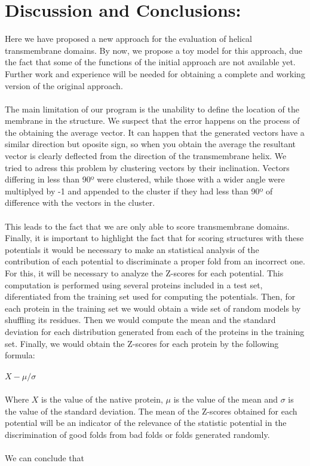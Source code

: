 \documentclass[12pt,titlepage]{article}
\theoremstyle{supercalifragilisticexpialidocious}
\begin{document}
\section{Discussion and Conclusions: }

Here we have proposed a new approach for the evaluation of helical transmembrane domains. By now, we propose a toy model for this approach, due the fact that some of the functions of the initial approach are not available yet. Further work and experience will be needed for obtaining a complete and working version of the original approach.
\\ \\
The main limitation of our program is the unability to define the location of the membrane in the structure. We suspect that the error happens on the process of the obtaining the average vector. It can happen that the generated vectors have a similar direction but oposite sign, so when you obtain the average the resultant vector is clearly deflected from the direction of the transmembrane helix. We tried to adress this problem by clustering vectors by their inclination. Vectors differing in less than 90º were clustered, while those with a wider angle were multiplyed by -1 and appended to the cluster if they had less than 90º of difference with the vectors in the cluster.
\\ \\
This leads to the fact that we are only able to score transmembrane domains. Finally, it is important to highlight the fact that for scoring structures with these potentials it would be necessary to make an statistical analysis of the contribution of each potential to discriminate a proper fold from an incorrect one. For this, it will be necessary to analyze the Z-scores for each potential. This computation is performed using several proteins included in a test set, diferentiated from the training set used for computing the potentials. Then, for each protein in the training set we would obtain a wide set of random models by shuffling its residues. Then we would compute the mean and the standard deviation for each distribution generated from each of the proteins in the training set. Finally, we would obtain the Z-scores for each protein by the following formula:
\\ \\
$X - \mu / \sigma$   
\\ \\
Where $X$ is the value of the native protein, $\mu$ is the value of the mean and $\sigma$ is the value of the standard deviation. The mean of the Z-scores obtained for each potential will be an indicator of the relevance of the statistic potential in the discrimination of good folds from bad folds or folds generated randomly.
\\ \\
We can conclude that
\end{document}
